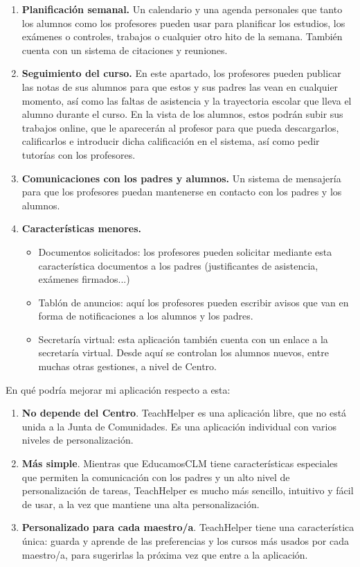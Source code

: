 \begin{enumerate}
    \item \textbf{Planificación semanal.}
    Un calendario y una agenda personales que tanto los alumnos como los profesores pueden usar para planificar los estudios, los exámenes o controles, trabajos o cualquier otro hito de la semana. También cuenta con un sistema de citaciones y reuniones.
    \item \textbf{Seguimiento del curso.}
    En este apartado, los profesores pueden publicar las notas de sus alumnos para que estos y sus padres las vean en cualquier momento, así como las faltas de asistencia y la trayectoria escolar que lleva el alumno durante el curso.
    En la vista de los alumnos, estos podrán subir sus trabajos online, que le aparecerán al profesor para que pueda descargarlos, calificarlos e introducir dicha calificación en el sistema, así como pedir tutorías con los profesores.
    \item \textbf{Comunicaciones con los padres y alumnos.}
    Un sistema de mensajería para que los profesores puedan mantenerse en contacto con los padres y los alumnos.
    \item \textbf{Características menores.}
        \begin{itemize}
            \item Documentos solicitados: los profesores pueden solicitar mediante esta característica documentos a los padres (justificantes de asistencia, exámenes firmados...)
            \item Tablón de anuncios: aquí los profesores pueden escribir avisos que van en forma de notificaciones a los alumnos y los padres.
            \item Secretaría virtual: esta aplicación también cuenta con un enlace a la secretaría virtual. Desde aquí se controlan los alumnos nuevos, entre muchas otras gestiones, a nivel de Centro.
        \end{itemize}
\end{enumerate}
        
En qué podría mejorar mi aplicación respecto a esta:

\begin{enumerate}
    \item \textbf{No depende del Centro}. TeachHelper es una aplicación libre, que no está unida a la Junta de Comunidades. Es una aplicación individual con varios niveles de personalización.
    \item \textbf{Más simple}. Mientras que EducamosCLM tiene características especiales que permiten la comunicación con los padres y un alto nivel de personalización de tareas, TeachHelper es mucho más sencillo, intuitivo y fácil de usar, a la vez que mantiene una alta personalización.
    \item \textbf{Personalizado para cada maestro/a}. TeachHelper tiene una característica única: guarda y aprende de las preferencias y los cursos más usados por cada maestro/a, para sugerirlas la próxima vez que entre a la aplicación.
\end{enumerate}


